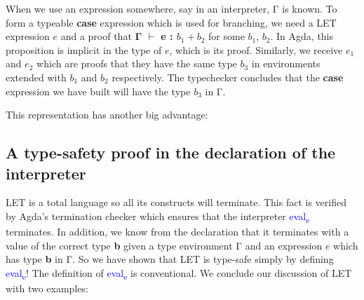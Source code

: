 \documentclass[12pt]{article}
\begin{document}
	When we use an expression somewhere, say in an interpreter, Γ is known. To form a typeable \textbf{case} expression which is used for branching, we need a LET expression $e$ and a proof that \textbf{Γ $\vdash$ e : $b_1 + b_2$} for some \textbf{$b_1$}, \textbf{$b_2$}. In Agda, this proposition is implicit in the type of $e$, which is its proof. Similarly, we receive $e_1$ and $e_2$ which are proofs that they have the same type \textbf{$b_3$} in environments extended with \textbf{$b_1$} and \textbf{$b_2$} respectively. The typechecker concludes that the \textbf{case} expression we have built will have the type \textbf{$b_3$} in Γ.
	
	This representation has another big advantage:
	
	\subsection{A type-safety proof in the declaration of the interpreter}
	

	LET is a total language so all its constructs will terminate. This fact is verified by Agda's termination checker which ensures that the interpreter \textcolor{blue}{eval\textsubscript{e}} terminates. In addition, we know from the declaration that it terminates with a value of the correct type \textbf{b} given a type environment Γ and an expression $e$ which has type \textbf{b} in Γ. So we have shown that LET is type-safe simply by defining \textcolor{blue}{eval\textsubscript{e}}! The definition of \textcolor{blue}{eval\textsubscript{e}} is conventional. We conclude our discussion of LET with two examples:
	
\end{document}
